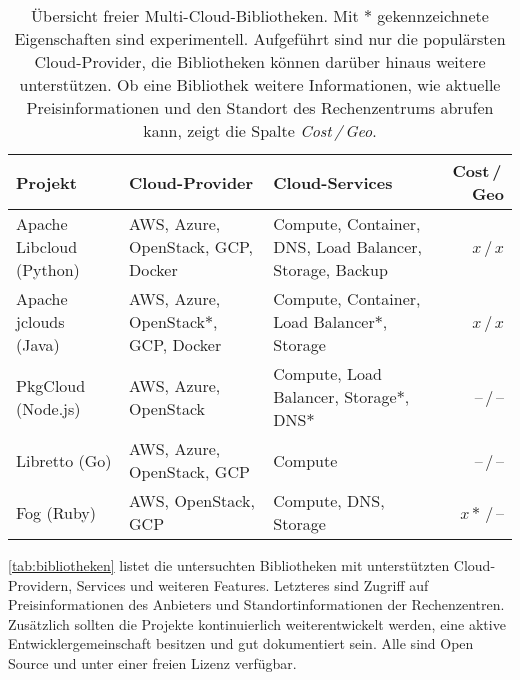 \begin{table*}\centering
	\begin{minipage}{\textwidth}
		\caption{Übersicht freier Multi-Cloud-Bibliotheken. Mit $*$ gekennzeichnete Eigenschaften sind experimentell. Aufgeführt sind nur die populärsten Cloud-Provider, die Bibliotheken können darüber hinaus weitere unterstützen. Ob eine Bibliothek weitere Informationen, wie aktuelle Preisinformationen und den Standort des Rechenzentrums abrufen kann, zeigt die Spalte \emph{Cost\,/\,Geo}.}
		\begin{tabularx}{\textwidth}{>{\centering}XXXr} \toprule
			Projekt & Cloud-Provider & Cloud-Services & Cost\,/\,Geo\\ \midrule
			Apache Libcloud (Python)\footnotemark & AWS, Azure, OpenStack, GCP, Docker & Compute, Container, DNS, Load Balancer, Storage, Backup & $x$\,/\,$x$\\
			Apache jclouds (Java)\footnotemark & AWS, Azure, Open\-Stack$*$, GCP, Docker & Compute, Container, Load Balancer$*$, Storage & $x$\,/\,$x$\\
			PkgCloud (Node.js)\footnotemark & AWS, Azure, OpenStack& Compute, Load Balancer, Storage$*$, DNS$*$ & --\,/\,--\\
			Libretto (Go)\footnotemark & AWS, Azure, OpenStack, GCP & Compute & --\,/\,--\\
			Fog (Ruby)\footnotemark & AWS, OpenStack, GCP & Compute, DNS, Storage & $x*$\,/\,--\\
			\bottomrule
		\end{tabularx}
		\label{tab:bibliotheken}
		\vspace{150pt}
	\end{minipage}  
\end{table*}

\autoref*{tab:bibliotheken} listet die untersuchten Bibliotheken mit unterstützten Cloud-Providern, Services und weiteren Features. Letzteres sind Zugriff auf Preisinformationen des Anbieters und Standortinformationen der Rechenzentren. Zusätzlich sollten die Projekte kontinuierlich weiterentwickelt werden, eine aktive Entwicklergemeinschaft besitzen und gut dokumentiert sein. Alle sind Open Source und unter einer freien Lizenz verfügbar.

